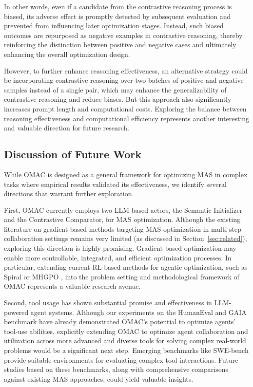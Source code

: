 In other words, even if a candidate from the contrastive reasoning process is biased, its adverse effect is promptly detected by subsequent evaluation and prevented from influencing later optimization stages. Instead, such biased outcomes are repurposed as negative examples in contrastive reasoning, thereby reinforcing the distinction between positive and negative cases and ultimately enhancing the overall optimization design.

However, to further enhance reasoning effectiveness, an alternative strategy could be incorporating contrastive reasoning over two batches of positive and negative samples instead of a single pair, which may enhance the generalizability of contrastive reasoning and reduce biases. But this approach also significantly increases prompt length and computational costs. Exploring the balance between reasoning effectiveness and computational efficiency represents another interesting and valuable direction for future research.



\subsection{Discussion of Future Work}\label{sec:future}


While OMAC is designed as a general framework for optimizing MAS in complex tasks where empirical results validated its effectiveness, we identify several directions that warrant further exploration.

First, OMAC currently employs two LLM-based actors, the Semantic Initializer and the Contrastive Comparator, for MAS optimization. Although the existing literature on gradient-based methods targeting MAS optimization in multi-step collaboration settings remains very limited (as discussed in Section~\ref{sec:related}), exploring this direction is highly promising. Gradient-based optimization may enable more controllable, integrated, and efficient optimization processes. In particular, extending current RL-based methods for agentic optimization, such as Spiral \cite{liu2025spiral} or MHGPO \cite{chen2025heterogeneous}, into the problem setting and methodological framework of OMAC represents a valuable research avenue.

Second, tool usage has shown substantial promise and effectiveness in LLM-powered agent systems. Although our experiments on the HumanEval and GAIA benchmark have already demonstrated OMAC’s potential to optimize agents’ tool-use abilities, explicitly extending OMAC to optimize agent collaboration and utilization across more advanced and diverse tools for solving complex real-world problems would be a significant next step. Emerging benchmarks like SWE-bench \cite{jimenez2023swe} provide suitable environments for evaluating complex tool interactions. Future studies based on these benchmarks, along with comprehensive comparisons against existing MAS approaches, could yield valuable insights.


